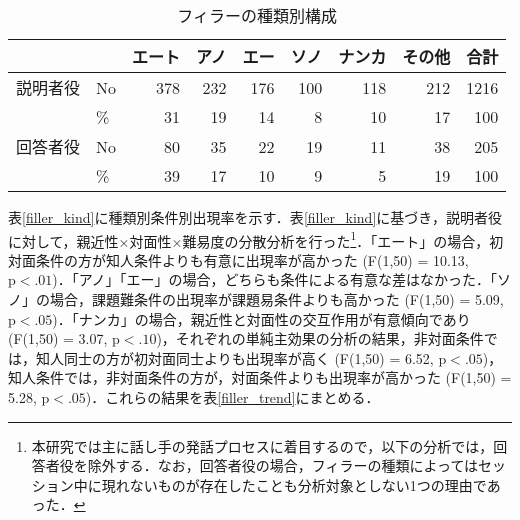 \documentclass[japanese]{jnlp_1.3a}
\begin{document}
\begin{table}[b]
\caption{フィラーの種類別構成} \label{ab}
\begin{center}
\small
\begin{tabular}{llrrrrrrr} \hline
 &  & エート & アノ & エー & ソノ & ナンカ & その他 & 合計 \\ \hline
説明者役 & No & 378 & 232 & 176 & 100 & 118 & 212 & 1216 \\
 & \% & \phantom{0}31 & \phantom{0}19 & \phantom{0}14 & \phantom{00}8 & \phantom{00}10 & \phantom{0}17 & \phantom{0}100 \\
回答者役 & No & \phantom{0}80 & \phantom{0}35 & \phantom{0}22 & \phantom{0}19 & \phantom{0}11 & \phantom{0}38 & \phantom{0}205 \\
 & \% & \phantom{0}39 & \phantom{0}17 & \phantom{0}10 & \phantom{00}9 & \phantom{00}5 & \phantom{0}19 & \phantom{0}100 \\ \hline
\end{tabular}
\end{center}
\end{table} 


表\ref{filler_kind}に種類別条件別出現率を示す．表\ref{filler_kind}に基づき，説明者役に対して，親近性×対面性×難易度の分散分析を行った\footnote{本研究では主に話し手の発話プロセスに着目するので，以下の分析では，回答者役を除外する．なお，回答者役の場合，フィラーの種類によってはセッション中に現れないものが存在したことも分析対象としない1つの理由であった．}．「エート」の場合，初対面条件の方が知人条件よりも有意に出現率が高かった (F(1,50) = 10.13, $\mathrm{p} < .01$)．「アノ」「エー」の場合，どちらも条件による有意な差はなかった．「ソノ」の場合，課題難条件の出現率が課題易条件よりも高かった (F(1,50) = 5.09, $\mathrm{p} < .05$)．「ナンカ」の場合，親近性と対面性の交互作用が有意傾向であり (F(1,50) = 3.07, $\mathrm{p} < .10$)，それぞれの単純主効果の分析の結果，非対面条件では，知人同士の方が初対面同士よりも出現率が高く (F(1,50) = 6.52, $\mathrm{p} < .05$)，知人条件では，非対面条件の方が，対面条件よりも出現率が高かった (F(1,50) = 5.28, $\mathrm{p} < .05$)．これらの結果を表\ref{filler_trend}にまとめる．
\end{document}
